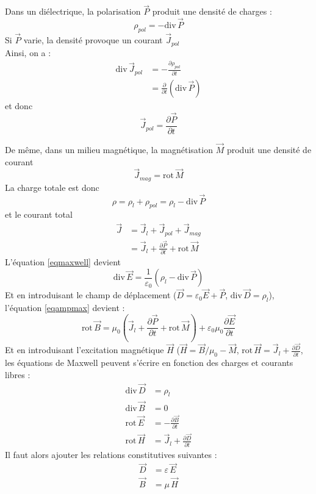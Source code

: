 \documentclass	[11pt, a4paper, openany]{book}
\newcommand{\rot}{\text{rot}\,}
\newcommand{\divv}{\text{div}\,}
\begin{document}
	Dans un diélectrique, la polarisation $\vec P$ produit une densité de charges :\begin{equation}
	\rho_{pol}=-\divv\vec P
	\end{equation}
	Si $\vec P$ varie, la densité provoque un courant $\vec J_{pol}$\\
	Ainsi, on a :\begin{align}
	\divv\vec J_{pol} & =-\frac{\partial \rho_{pol}}{\partial t}\\
	& =\frac{\partial}{\partial t}\left(\divv\vec P\right)
	\end{align}
	et donc\begin{equation}
	\vec J_{pol}=\frac{\partial\vec P}{\partial t}
	\end{equation}
	
	De même, dans un milieu magnétique, la magnétisation $\vec M$ produit une densité de courant \begin{equation}
	\vec J_{mag}=\rot\vec M
	\end{equation}
	La charge totale est donc \begin{equation}
	\rho=\rho_l+\rho_{pol}=\rho_l-\divv\vec P
	\end{equation}
	et le courant total \begin{align}
	\vec J & =\vec J_l+\vec J_{pol}+\vec J_{mag}\\
	& =\vec J_l+\frac{\partial\vec P}{\partial t}+\rot\vec M
	\end{align}
	L'équation \eqref{eqmaxwell} devient \begin{equation}
	\divv\vec E=\frac{1}{\varepsilon_0}\left(\rho_l-\divv\vec P\right)
	\end{equation}
	Et en introduisant le champ de déplacement ($\vec D=\varepsilon_0\vec E+\vec P$, $\divv\vec D=\rho_l$), l'équation \eqref{eqampmax} devient : \begin{equation}
	\rot\vec B=\mu_0\left(\vec J_l+\frac{\partial \vec P}{\partial t}+\rot\vec M\right)+\varepsilon_0\mu_0\frac{\partial\vec E}{\partial t}
	\end{equation}
	Et en introduisant l'excitation magnétique $\vec H$ ($\vec H=\vec B/\mu_0-\vec M$, $\rot\vec H=\vec J_l+\frac{\partial\vec D}{\partial t}$, les équations de Maxwell peuvent s'écrire en fonction des charges et courants libres : \begin{align}
	\divv\vec D & =\rho_l\\
	\divv\vec B & =0\\
	\rot\vec E & =-\frac{\partial\vec B}{\partial t}\\
	\rot\vec H & =\vec J_l+\frac{\partial\vec D}{\partial t}
	\end{align}
	Il faut alors ajouter les relations constitutives suivantes :\begin{align}
	\vec D & =\varepsilon\,\vec E\\
	\vec B & = \mu\,\vec H
	\end{align}
\end{document}
